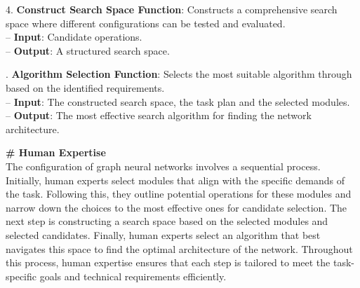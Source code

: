 \documentclass[11pt,UTF8,fontset=fandol]{ctexart}
\begin{document}
\begin{table}[H]
\begin{promptbox}
4. \textbf{Construct Search Space Function}: Constructs a comprehensive search space where different configurations can be tested and evaluated.\\
\hspace*{1em}-- \textbf{Input}: Candidate operations.\\
\hspace*{1em}-- \textbf{Output}: A structured search space.\par{}. \textbf{Algorithm Selection Function}: Selects the most suitable algorithm through based on the identified requirements.\\
\hspace*{1em}-- \textbf{Input}: The constructed search space, the task plan and the selected modules.\\
\hspace*{1em}-- \textbf{Output}: The most effective search algorithm for finding the network architecture.\par\medskip
\textbf{\# Human Expertise}\\
The configuration of graph neural networks involves a sequential process. Initially, human experts select modules that align with the specific demands of the task. Following this, they outline potential operations for these modules and narrow down the choices to the most effective ones for candidate selection. The next step is constructing a search space based on the selected modules and selected candidates. Finally, human experts select an algorithm that best navigates this space to find the optimal architecture of the network. Throughout this process, human expertise ensures that each step is tailored to meet the task-specific goals and technical requirements efficiently.
\end{promptbox}
\end{table}
\end{document}
